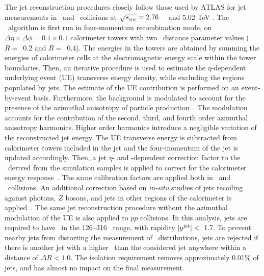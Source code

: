 
The jet reconstruction procedures closely follow those used by \mbox{ATLAS} for jet measurements in \pp\ and \PbPb\ collisions at
$\mbox{$\sqrt{s_{_\text{NN}}}$}=2.76$~\TeV~\cite{Aad:2014bxa} and 5.02 TeV \cite{2019108}.
The \antikt\ algorithm is first run in four-momentum recombination mode, on
$\Delta \eta \times \Delta \phi = 0.1\times 0.1$  calorimeter towers with two \antikt\ distance parameter values ($R=$~0.2 and $R=$~0.4). The energies in the towers are obtained by summing the
	energies of calorimeter cells at the electromagnetic energy scale within the tower boundaries. Then,
	  an iterative procedure is used to estimate the $\eta$-dependent underlying event (UE)  transverse energy density, while excluding the regions populated by jets. The estimate of the UE contribution is performed on an event-by-event basis.
	Furthermore, the background is modulated to account for the presence of the azimuthal anisotropy of particle production~\cite{ATLAS:2012at}. The modulation accounts for the contribution of the second, third, and fourth order azimuthal anisotropy harmonics.
	Higher order harmonics introduce a negligible variation of the reconstructed jet energy.
	The UE transverse energy is subtracted from calorimeter towers included in the jet and the four-momentum of the jet is updated accordingly.
	  Then, a jet $\eta$- and \pT-dependent  correction factor to the \ptjet\ 
	  derived from the simulation samples is applied to correct for the calorimeter energy
	  response~\cite{Aaboud:2017jcu}. The same calibration factors are applied both 
in \pp\ and \pbpb\ collisions.
An additional correction based on \textit{in-situ} studies of jets recoiling against photons, $Z$ bosons, and jets in other regions of the calorimeter is
	  applied~\cite{ATL-PHYS-PUB-2015-036,ATLAS-CONF-2016-110}. The same jet reconstruction procedure without the
	  azimuthal modulation of the UE is also applied to $pp$ collisions.
	  In this analysis, jets are required to have \ptjet\ in the 126--316 \GeV\ range, with rapidity  $|\mbox{$y^{\mathrm{jet}}$}|<$~1.7. 
 To prevent nearby jets from distorting the measurement of \Dptr\ distributions, 
jets are rejected if there is another jet with a higher \ptjet\ than the considered jet anywhere
within a distance of $\Delta R < 1.0$. The isolation requirement removes approximately 0.01\% of jets, and has almost no impact on the final measurement.

